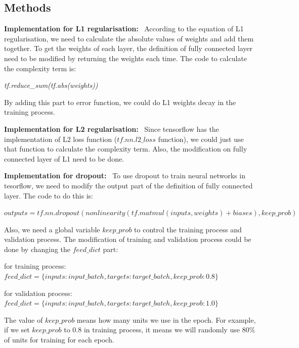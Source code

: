 \documentclass[]{article}
\begin{document}
\subsection{Methods}

\textbf{Implementation for L1 regularisation:} \ According to the equation of L1 regularisation, we need to calculate the absolute values of weights and add them together. To get the weights of each layer, the definition of fully connected layer need to be modified by returning the weights each time. The code to calculate the complexity term is:

\emph{tf.reduce\_sum(tf.abs(weights))}

By adding this part to error function, we could do L1 weights decay in the training process.

\textbf{Implementation for L2 regularisation:} \ Since tensorflow has the implementation of L2 loss function ($tf.nn.l2\_loss$ function), we could just use that function to calculate the complexity term. Also, the modification on fully connected layer of L1 need to be done.

\textbf{Implementation for dropout:} \ To use dropout to train neural networks in tesorflow, we need to modify the output part of the definition of fully connected layer. The code to do this is:

\emph{$outputs = tf.nn.dropout(nonlinearity(tf.matmul(inputs, weights) + biases),keep\_prob)$}  

Also, we need a global variable $keep\_prob$ to control the training process and validation process. The modification of training and validation process could be done by changing the $feed\_dict$ part:

for training process: {$feed\_dict=\{inputs: input\_batch, targets: target\_batch, keep\_prob:0.8\}$}

for validation process: {$feed\_dict=\{inputs: input\_batch, targets: target\_batch, keep\_prob:1.0\}$}

The value of $keep\_prob$ means how many units we use in the epoch. For example, if we set $keep\_prob$ to $0.8$ in training process, it means we will randomly use $80\%$ of units for training for each epoch.
\end{document}
